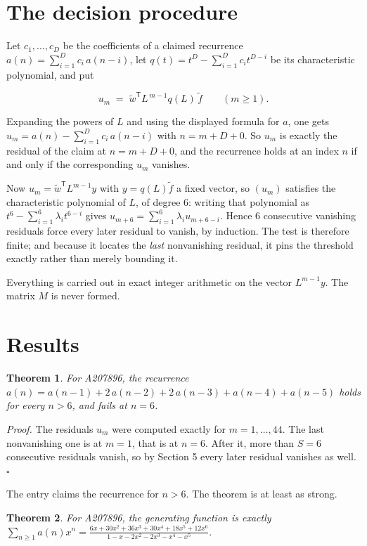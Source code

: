 \documentclass[11pt]{article}
\newtheorem{theorem}{Theorem}
\theoremstyle{definition}
\begin{document}
\section{The decision procedure}

Let $c_1,\dots,c_D$ be the coefficients of a claimed recurrence $a(n) = \sum_{i=1}^{D} c_i\,a(n-i)$, let $q(t) = t^{D} - \sum_{i=1}^{D} c_i t^{D-i}$ be its characteristic polynomial, and put

\[u_m \;=\; \tilde w^{\mathsf T} L^{\,m-1} q(L)\,\tilde f \qquad (m \ge 1).\]

Expanding the powers of $L$ and using the displayed formula for $a$, one gets $u_m = a(n) - \sum_{i=1}^{D} c_i\,a(n-i)$ with $n = m + D + 0$. So $u_m$ is exactly the residual of the claim at $n = m + D + 0$, and the recurrence holds at an index $n$ if and only if the corresponding $u_m$ vanishes.

Now $u_m = \tilde w^{\mathsf T} L^{m-1} y$ with $y = q(L)\tilde f$ a fixed vector, so $(u_m)$ satisfies the characteristic polynomial of $L$, of degree $6$: writing that polynomial as $t^{6} - \sum_{i=1}^{6} \lambda_i t^{6-i}$ gives $u_{m+6} = \sum_{i=1}^{6} \lambda_i u_{m+6-i}$. Hence $6$ consecutive vanishing residuals force every later residual to vanish, by induction. The test is therefore finite; and because it locates the {\itshape last} nonvanishing residual, it pins the threshold exactly rather than merely bounding it.

Everything is carried out in exact integer arithmetic on the vector $L^{m-1}y$. The matrix $M$ is never formed.

\section{Results}

\begin{theorem} For A207896, the recurrence $a(n) = a(n-1) + 2\,a(n-2) + 2\,a(n-3) + a(n-4) + a(n-5)$ holds for every $n > 6$, and fails at $n = 6$.\end{theorem}

{\itshape Proof.} The residuals $u_m$ were computed exactly for $m = 1,\dots,44$. The last nonvanishing one is at $m = 1$, that is at $n = 6$. After it, more than $S = 6$ consecutive residuals vanish, so by Section 5 every later residual vanishes as well. $\square$

The entry claims the recurrence for $n > 6$. The theorem is at least as strong.

\begin{theorem} For A207896, the generating function is exactly $\sum_{n\ge 1} a(n)x^n = \frac{6x + 30x^{2} + 36x^{3} + 30x^{4} + 18x^{5} + 12x^{6}}{1 - x - 2x^{2} - 2x^{3} - x^{4} - x^{5}}$.\end{theorem}
\end{document}
